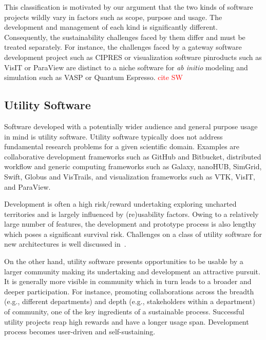 \documentclass[11pt, oneside]{amsart}
\newcommand{\note}[1]{ {\textcolor{red}    { #1 }}}
\newcommand{\toolname}[1] {\textsf{#1}}
\begin{document}
This classification is motivated by our argument that the two kinds of
software projects wildly vary in factors such as scope, purpose and
usage. The development and management of each kind is significantly
different. Consequently, the sustainability challenges faced by them
differ and must be treated separately. For instance, the challenges
faced by a gateway software development project such as
\toolname{CIPRES} or visualization software pinroducts such as
\toolname{VisIT} or \toolname{ParaView} are distinct to a niche software for
\textit{ab initio} modeling and simulation such as \toolname{VASP} or
\toolname{Quantum Espresso}. \note{cite SW} 

\subsection{Utility Software}
Software developed with a potentially wider audience and general
purpose usage in mind is utility software. Utility software typically
does not address fundamental research problems for a given scientific
domain. Examples are collaborative development frameworks such as
\toolname{GitHub} and \toolname{Bitbucket}, distributed workflow and
generic computing frameworks such as \toolname{Galaxy},
\toolname{nanoHUB}, \toolname{SimGrid}, \toolname{Swift},
\toolname{Globus} and \toolname{VisTrails}, and visualization
frameworks such as \toolname{VTK}, \toolname{VisIT}, and \toolname{ParaView}.

Development is often a high risk/reward undertaking exploring
uncharted territories and is largely influenced by (re)usability
factors. Owing to a relatively large number of features, the development
and prototype process is also lengthy which poses a significant
survival risk. Challenges on a class of utility software for new
architectures is well discussed in~\cite{Ferenbaugh_WSSSPE}.

On the other hand, utility software presents opportunities to be
usable by a larger community making its undertaking and development an
attractive pursuit.  It is generally more visible in community which
in turn leads to a broader and deeper participation. For instance,
promoting collaborations across the breadth (e.g., different
departments) and depth (e.g., stakeholders within a department) of
community, one of the key ingredients of a sustainable
process. Successful utility projects reap high rewards and have a
longer usage span. Development process becomes user-driven and
self-sustaining.
\end{document}
